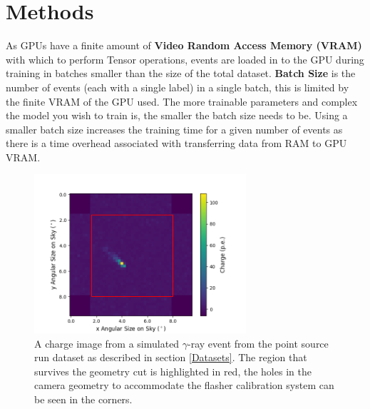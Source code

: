 \section{Methods} \label{Methods}

As GPUs have a finite amount of \textbf{Video Random Access Memory (VRAM)} with which to perform Tensor operations, events are loaded in to the GPU during training in batches smaller than the size of the total dataset. \textbf{Batch Size} is the number of events (each with a single label) in a single batch, this is limited by the finite VRAM of the GPU used. The more trainable parameters and complex the model you wish to train is, the smaller the batch size needs to be. Using a smaller batch size increases the training time for a given number of events as there is a time overhead associated with transferring data from RAM to GPU VRAM. 
 
\begin{figure}
  \centering
  \includegraphics[width=0.7\textwidth]{figures/gammacut.png}
  \caption{A charge image from a simulated $\gamma$-ray event from the point source run dataset as described in section \ref{Datasets}. The region that survives the geometry cut is highlighted in red, the holes in the camera geometry to accommodate the flasher calibration system can be seen in the corners.}
  \label{fig:gammacut}
\end{figure}

